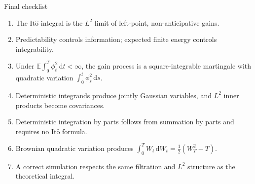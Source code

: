\documentclass[10pt]{article}
\newcommand{\E}{\mathbb E}
\newcommand{\1}{\mathbf 1}
\newcommand{\dd}{\,\mathrm d}
\newcommand{\Ito}{\mathrm{It\hat{o}}}
\theoremstyle{definition}
\begin{document}
\begin{keyidea}{Final checklist}
\begin{enumerate}
  \item The \(\Ito\) integral is the \(L^2\) limit of left-point,
        non-anticipative gains.
  \item Predictability controls information; expected finite energy controls
        integrability.
  \item Under \(\E\int_0^T\phi_t^2\dd t<\infty\), the gain process is a
        square-integrable martingale with quadratic variation
        \(\int_0^t\phi_s^2\dd s\).
  \item Deterministic integrands produce jointly Gaussian variables, and
        \(L^2\) inner products become covariances.
  \item Deterministic integration by parts follows from summation by parts and
        requires no \(\Ito\) formula.
  \item Brownian quadratic variation produces
        \(\int_0^TW_t\dd W_t=\frac12(W_T^2-T)\).
  \item A correct simulation respects the same filtration and \(L^2\)
        structure as the theoretical integral.
\end{enumerate}
\end{keyidea}
\end{document}

